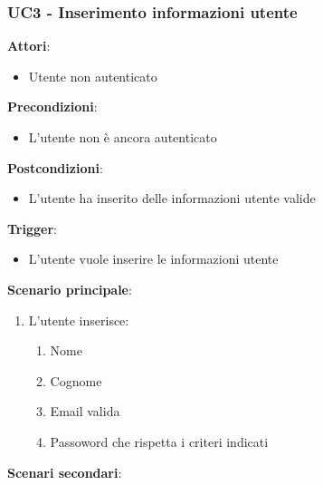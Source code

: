 \subsubsection{UC3 - Inserimento informazioni utente}\label{usecase:3}
\textbf{Attori}: 
\begin{itemize}
    \item Utente non autenticato
\end{itemize}
\textbf{Precondizioni}:
\begin{itemize}
    \item L'utente non è ancora autenticato
\end{itemize}
\textbf{Postcondizioni}: 
\begin{itemize}
    \item L'utente ha inserito delle informazioni utente valide
\end{itemize}
\textbf{Trigger}:
\begin{itemize}
    \item L'utente vuole inserire le informazioni utente
\end{itemize}
\textbf{Scenario principale}:
\begin{enumerate}
    \item L'utente inserisce:
    \begin{enumerate}
        \item Nome
        \item Cognome
        \item Email valida %
        \item Passoword che rispetta i criteri indicati %
    \end{enumerate}
\end{enumerate}
\textbf{Scenari secondari}:
